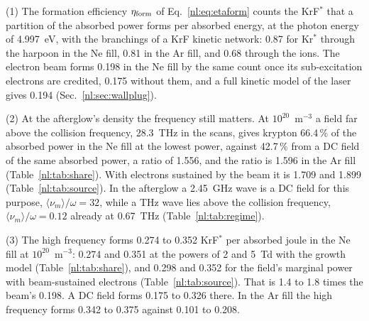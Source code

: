 {\noindent}(1) The formation efficiency $\eta_{\rm form}$ of Eq.~\eqref{nl:eq:etaform}
counts the KrF$^*$ that a partition of the absorbed power forms per absorbed energy, at
the photon energy of 4.997~eV, with the branchings of a KrF kinetic network: 0.87 for
Kr$^*$ through the harpoon in the Ne fill, 0.81 in the Ar fill, and 0.68 through the
ions. The electron beam forms 0.198 in the Ne fill by the same count once its
sub-excitation electrons are credited, 0.175 without them, and a full kinetic model of
the laser gives 0.194 (Sec.~\ref{nl:sec:wallplug}).

{\noindent}(2) At the afterglow's density the frequency still matters. At
$10^{20}$~m$^{-3}$ a field far above the collision frequency, 28.3~THz in the scans,
gives krypton 66.4\,\% of the absorbed power in the Ne fill at the lowest power, against
42.7\,\% from a DC field of the same absorbed power, a ratio of 1.556, and the ratio is
1.596 in the Ar fill (Table~\ref{nl:tab:share}). With electrons sustained by the beam
it is 1.709 and 1.899 (Table~\ref{nl:tab:source}). In the afterglow a 2.45~GHz wave is a
DC field for this purpose, $\langle\nu_m\rangle/\omega=32$, while a THz wave lies above
the collision frequency, $\langle\nu_m\rangle/\omega=0.12$ already at 0.67~THz
(Table~\ref{nl:tab:regime}).

{\noindent}(3) The high frequency forms 0.274 to 0.352 KrF$^*$ per absorbed joule in the
Ne fill at $10^{20}$~m$^{-3}$: 0.274 and 0.351 at the powers of 2 and 5~Td with the growth
model (Table~\ref{nl:tab:share}), and 0.298 and 0.352 for the field's marginal power with
beam-sustained electrons (Table~\ref{nl:tab:source}). That is 1.4 to 1.8 times the
beam's 0.198. A DC field forms 0.175 to 0.326 there. In the Ar fill the high frequency
forms 0.342 to 0.375 against 0.101 to 0.208.

